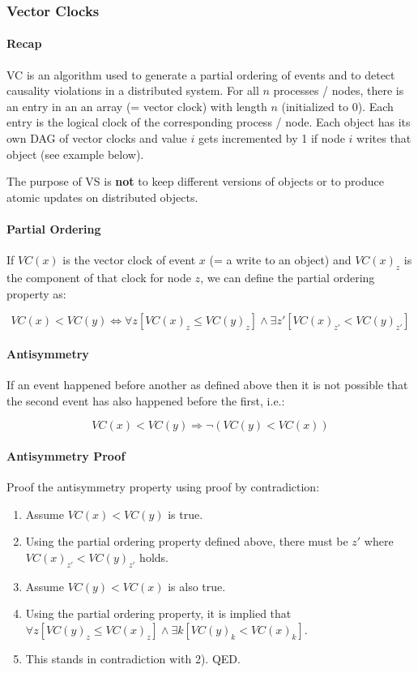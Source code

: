 \subsubsection{Vector Clocks}

\paragraph{Recap}
VC is an algorithm used to generate a partial ordering of events and to detect causality violations in a distributed system. For all $n$ processes / nodes, there is an entry in an an array (= vector clock) with length $n$ (initialized to 0). Each entry is the logical clock of the corresponding process / node. Each object has its own DAG of vector clocks and value $i$ gets incremented by 1 if node $i$ writes that object (see example below).

The purpose of VS is \textbf{not} to keep different versions of objects or to produce atomic updates on distributed objects.

\paragraph{Partial Ordering}
If $VC(x)$ is the vector clock of event $x$ (= a write to an object) and $VC(x)_z$ is the component of that clock for node $z$, we can define the partial ordering property as:

$$
VC(x) < VC(y) \Longleftrightarrow \forall z [VC(x)_z \leq VC(y)_z] \land \exists z' [VC(x)_{z'} < VC(y)_{z'}]
$$

\paragraph{Antisymmetry}
If an event happened before another as defined above then it is not possible that the second event has also happened before the first, i.e.:

$$
VC(x) < VC(y) \Longrightarrow \neg(VC(y) < VC(x))
$$

\paragraph{Antisymmetry Proof}
Proof the antisymmetry property using proof by contradiction:
\begin{enumerate}
    \item Assume $VC(x) < VC(y)$ is true.
    \item Using the partial ordering property defined above, there must be $z'$ where $VC(x)_{z'} < VC(y)_{z'}$ holds.
    \item Assume $VC(y) < VC(x)$ is also true.
    \item Using the partial ordering property, it is implied that $\forall z [VC(y)_z \leq VC(x)_z] \land \exists k [VC(y)_k < VC(x)_k]$.
    \item This stands in contradiction with 2). QED.
\end{enumerate}

